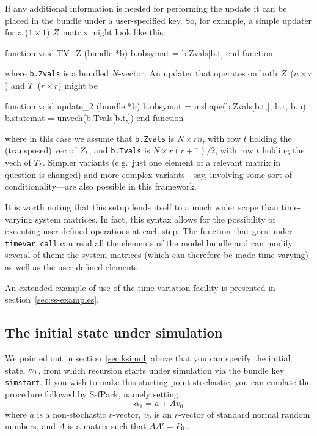 If any additional information is needed for performing the update it
can be placed in the bundle under a user-specified key.  So, for
example, a simple updater for a ($1 \times 1$) $Z$ matrix might
look like this:
%
\begin{code}
function void TV_Z (bundle *b)
    b.obsymat = b.Zvals[b.t]
end function
\end{code}
%
where \texttt{b.Zvals} is a bundled $N$-vector. An updater that
operates on both $Z$ ($n \times r$) and $T$ ($r \times
r$) might be
%
\begin{code}
function void update_2 (bundle *b)
    b.obsymat = mshape(b.Zvals[b.t,], b.r, b.n)
    b.statemat = unvech(b.Tvals[b.t,])
end function
\end{code}
%
where in this case we assume that \texttt{b.Zvals} is $N \times rn$,
with row $t$ holding the (transposed) vec of $Z_t$, and
\texttt{b.Tvals} is $N \times r(r+1)/2$, with row $t$ holding the vech
of $T_t$. Simpler variants (e.g.\ just one element of a
relevant matrix in question is changed) and more complex
variants---say, involving some sort of conditionality---are also
possible in this framework.

It is worth noting that this setup lends itself to a much wider scope
than time-varying system matrices. In fact, this syntax allows for the
possibility of executing user-defined operations at each step. The
function that goes under \texttt{timevar\_call} can read all the
elements of the model bundle and can modify several of them: the
system matrices (which can therefore be made time-varying) as well as
the user-defined elements.

An extended example of use of the time-variation facility is presented
in section~\ref{sec:ss-examples}.

\subsection{The initial state under simulation}
\label{sec:simstart}

We pointed out in section~\ref{sec:ksimul} above that you can specify
the initial state, $\alpha_1$, from which recursion starts under
simulation via the bundle key \texttt{simstart}. If you wish to make
this starting point stochastic, you can emulate the procedure followed
by \textsf{SsfPack}, namely setting
\[
\alpha_1 = a + A v_0
\]
where $a$ is a non-stochastic $r$-vector, $v_0$ is an $r$-vector
of standard normal random numbers, and $A$ is a matrix such
that $AA' = P_0$.

